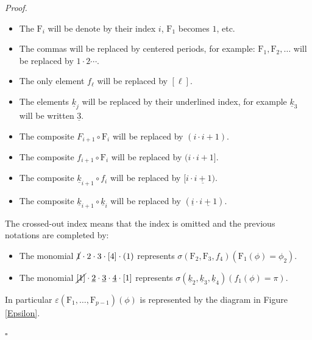 \documentclass[12pt,reqno]{amsart}
\theoremstyle{article}
\renewenvironment{proof}{\noindent \textit{Proof.}} {\nolinebreak\hfill $\square$}
\def \F{\mathrm F}
\newcommand{\ul}{\underline}
\let \epsilon=\varepsilon
\begin{document}
\begin{proof}
    \begin{itemize}
      \item[--] The $\F_i$ will be denote by their index $i$,
      $\F_1$ becomes $1$,
      etc.
      \item[--] The commas will be replaced by centered periods,
      for example: $\F_1, \F_2,\dots$ will be replaced by $1 \cdot 2 \cdots$.
      \item[--] The only element $f_\ell$ will be replaced by $[\ell]$.
      \item[--] The elements $\ul{k}_j$ will be replaced by their underlined index,
      for example $\ul{k}_3$ will be written $\ul3$.
      \item[--] The composite $F_{i+1} \circ \F_i$ will be replaced by $(i \cdot i+1)$.
      \item[--] The composite $f_{i+1} \circ \F_i$ will be replaced by $(i \cdot i+1]$.
      \item[--] The composite $\ul{k}_{i+1} \circ f_i$ will be replaced by $[i \cdot \ul{i+1})$.
      \item[--] The composite $\ul{k}_{i+1} \circ \ul{k}_{i}$ will be replaced by $(\ul{i} \cdot \ul{i+1})$.
    \end{itemize}
    
    The crossed-out index means that the index is omitted and the previous notations are completed by:
    
    \begin{itemize}
      \item[--] The monomial $\cancel 1 \cdot 2 \cdot 3 \cdot [4]\cdot(1)$ represents $\sigma(\F_2,\F_3,f_4)(\F_1(\phi) = \phi_2)$.
      \item[--] The monomial $\cancel{[1]}\cdot \ul{2} \cdot \ul{3} \cdot \ul{4} \cdot[1]$ represents $\sigma(\ul{k}_2,\ul{k}_3,\ul{k}_4)(f_1(\phi) = \pi)$.
    \end{itemize}
    
    In particular $\epsilon(\F_1,\dots,\F_{p-1})(\phi)$ is represented by the diagram in Figure \ref{Epsilon}.
    

\end{proof}
\end{document}
